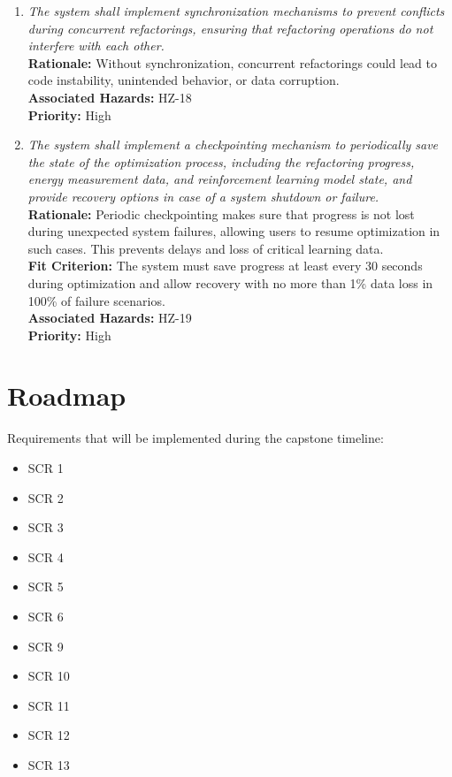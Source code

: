 \documentclass{article}
\begin{document}
\begin{enumerate}[label=SCR \arabic*., wide=0pt, leftmargin=*]
    \item \emph{The system shall implement synchronization mechanisms to prevent conflicts during concurrent refactorings, ensuring that refactoring operations do not interfere with each other.}\\
    {\bf Rationale:} Without synchronization, concurrent refactorings could lead to code instability, unintended behavior, or data corruption.\\
    {\bf Associated Hazards:} HZ-18\\
    {\bf Priority:} High

    \item \emph{The system shall implement a checkpointing mechanism to periodically save the state of the optimization process, including the refactoring progress, energy measurement data, and reinforcement learning model state, and provide recovery options in case of a system shutdown or failure.}\\
    {\bf Rationale:} Periodic checkpointing makes sure that progress is not lost during unexpected system failures, allowing users to resume optimization in such cases. This prevents delays and loss of critical learning data.\\
    {\bf Fit Criterion:} The system must save progress at least every 30 seconds during optimization and allow recovery with no more than 1\% data loss in 100\% of failure scenarios.\\
    {\bf Associated Hazards:} HZ-19\\
    {\bf Priority:} High

\end{enumerate}

\section{Roadmap}

Requirements that will be implemented during the capstone timeline:
\begin{itemize}
    \item SCR 1
    \item SCR 2
    \item SCR 3
    \item SCR 4
    \item SCR 5
    \item SCR 6
    \item SCR 9
    \item SCR 10
    \item SCR 11
    \item SCR 12
    \item SCR 13
\end{itemize}
\end{document}
